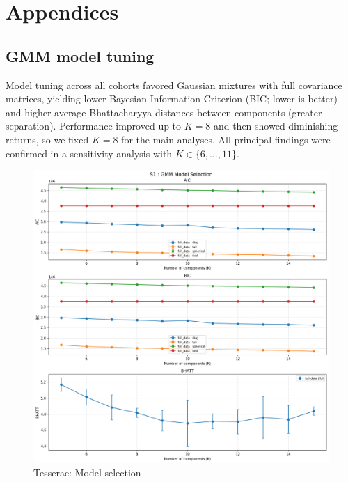 
\section{Appendices}

\begin{appendices}

\clearpage                    %
\section{GMM model tuning}

Model tuning across all cohorts favored Gaussian mixtures with full covariance matrices, yielding lower Bayesian Information Criterion (BIC; lower is better) and higher average Bhattacharyya distances between components (greater separation). Performance improved up to \(K=8\) and then showed diminishing returns, so we fixed \(K=8\) for the main analyses. All principal findings were confirmed in a sensitivity analysis with \(K \in \{6,\ldots,11\}\).


\begin{figure}[p]
  \centering
  \includegraphics[width=\linewidth]{figures/appendix/tesserae_gmm_model_selection.png}
  \caption{Tesserae: Model selection}
  \label{fig:tesserae_model_selection}
\end{figure}


\end{appendices}
